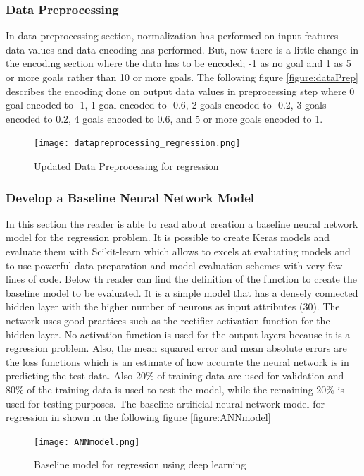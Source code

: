 \subsubsection{Data Preprocessing}
In data preprocessing section, normalization has performed on input features data values and data encoding has performed. But, now there is a little change in the encoding section where the data has to be encoded; -1 as no goal and 1 as 5 or more goals rather than 10 or more goals.\newline
The following figure \autoref{figure:dataPrep} describes the encoding done on output data values in preprocessing step where 0 goal encoded to -1, 1 goal encoded to -0.6, 2 goals encoded to -0.2, 3 goals encoded to 0.2, 4 goals encoded to 0.6, and 5 or more goals encoded to 1.\newline
\begin{figure}[H]
\begin{center}
\texttt{[image: datapreprocessing\_regression.png]}
\end{center}
\caption{Updated Data Preprocessing for regression }
\label{figure:dataPrep1}
\end{figure}
\subsubsection{Develop a Baseline Neural Network Model}
In this section the reader is able to read about creation a baseline neural network model for the regression problem. It is possible to create Keras models and evaluate them with Scikit-learn which allows to excels at evaluating models and to use powerful data preparation and model evaluation schemes with very few lines of code.\newline
Below th reader can find the definition of the function to create the baseline model to be evaluated. It is a simple model that has a densely connected hidden layer with the higher number of neurons as input attributes (30). The network uses good practices such as the rectifier activation function for the hidden layer. No activation function is used for the output layers because it is a regression problem.\newline
Also, the mean squared error and mean absolute errors are the loss functions which is an estimate of how accurate the neural network is in predicting the test data. Also 20\% of training data are used for validation and 80\% of the training data is used to test the model, while the remaining 20\% is used for testing purposes.\newline
The baseline artificial neural network model for regression in shown in the following figure \autoref{figure:ANNmodel} \newline
\begin{figure}[H]
\begin{center}
\texttt{[image: ANNmodel.png]}
\end{center}
\caption{Baseline model for regression using deep learning }
\label{figure:ANNmodel}
\end{figure}
